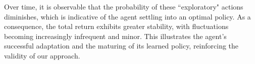 Over time, it is observable that the probability of these ``exploratory" actions diminishes, which is indicative of the agent settling into an optimal policy. As a consequence, the total return exhibits greater stability, with fluctuations becoming increasingly infrequent and minor. This illustrates the agent's successful adaptation and the maturing of its learned policy, reinforcing the validity of our approach.


 
